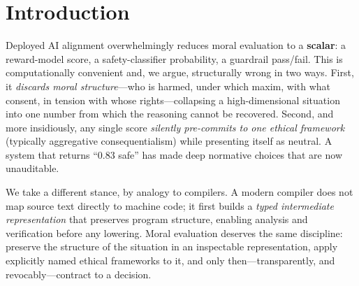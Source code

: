 \section{Introduction}
\label{sec:intro}

Deployed AI alignment overwhelmingly reduces moral evaluation to a \textbf{scalar}: a
reward-model score, a safety-classifier probability, a guardrail pass/fail. This is
computationally convenient and, we argue, structurally wrong in two ways. First, it
\emph{discards moral structure}---who is harmed, under which maxim, with what consent, in
tension with whose rights---collapsing a high-dimensional situation into one number from
which the reasoning cannot be recovered.   Second, and more
insidiously, any single score
\emph{silently pre-commits to one ethical framework} (typically aggregative
consequentialism) while presenting itself as neutral. A system that returns ``0.83 safe''
has made deep normative choices that are now unauditable.

We take a different stance, by analogy to compilers. A modern compiler does not map source
text directly to machine code; it first builds a \emph{typed intermediate representation}
that preserves program structure, enabling analysis and verification before any lowering.
Moral evaluation deserves the same discipline: preserve the structure of the situation in
an inspectable representation, apply explicitly named ethical frameworks to it, and only
then---transparently, and revocably---contract to a decision.

